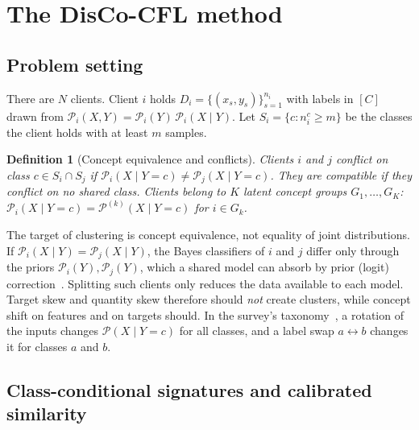 \documentclass[pdflatex,sn-apa]{sn-jnl}
\theoremstyle{thmstyleone}
\theoremstyle{thmstylethree}
\newtheorem{definition}{Definition}
\newcommand{\cP}{\mathcal{P}}
\begin{document}


\section{The DisCo-CFL method}\label{sec:method}
\subsection{Problem setting}\label{sec:setting}
There are $N$ clients. Client $i$ holds $D_i=\{(x_{s},y_{s})\}_{s=1}^{n_i}$ with labels in $[C]$ drawn from $\cP_i(X,Y)=\cP_i(Y)\,\cP_i(X\mid Y)$. Let $S_i=\{c: n_i^c\ge m\}$ be the classes the client holds with at least $m$ samples.
\begin{definition}[Concept equivalence and conflicts]\label{def:concept}
Clients $i$ and $j$ \emph{conflict on class} $c\in S_i\cap S_j$ if $\cP_i(X\mid Y=c)\neq\cP_j(X\mid Y=c)$. They are \emph{compatible} if they conflict on no shared class. Clients belong to $K$ latent concept groups $G_1,\dots,G_K$: $\cP_i(X\mid Y=c)=\cP^{(k)}(X\mid Y=c)$ for $i\in G_k$.
\end{definition}
The target of clustering is concept equivalence, not equality of joint distributions. If $\cP_i(X\mid Y)=\cP_j(X\mid Y)$, the Bayes classifiers of $i$ and $j$ differ only through the priors $\cP_i(Y),\cP_j(Y)$, which a shared model can absorb by prior (logit) correction~\citep{lipton2018labelshift,menon2021logit}. Splitting such clients only reduces the data available to each model. Target skew and quantity skew therefore should \emph{not} create clusters, while concept shift on features and on targets should. In the survey's taxonomy~\citep{benali2026survey}, a rotation of the inputs changes $\cP(X\mid Y=c)$ for all classes, and a label swap $a\leftrightarrow b$ changes it for classes $a$ and $b$.

\subsection{Class-conditional signatures and calibrated similarity}
\end{document}
